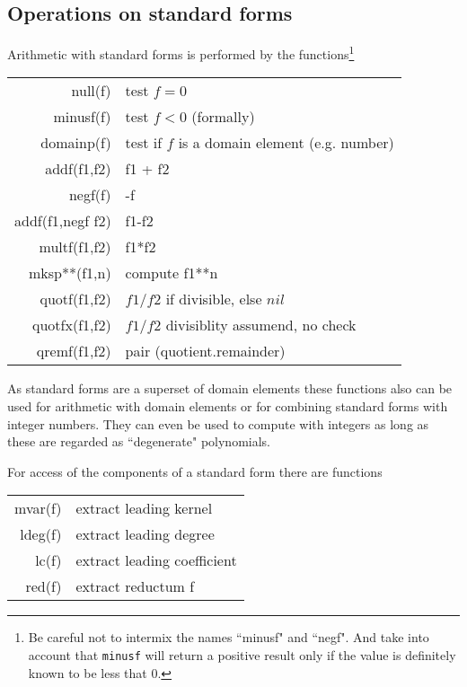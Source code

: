\subsection{Operations on standard forms}

Arithmetic with standard forms is performed by the
functions\footnote{Be careful not to intermix 
the names ``minusf" and ``negf".
And take into account that {\tt minusf} will return a positive result
only if the value is definitely known to be less that 0.}
\begin{center}
\begin{tabular}{|r|l|} \hline
    null(f)    & test $f=0$ \\
    minusf(f)  & test $f<0$ (formally) \\
    domainp(f) & test if $f$ is a domain element (e.g. number) \\
    addf(f1,f2)& f1 + f2 \\
    negf(f)    & -f \\
    addf(f1,negf f2) & f1-f2 \\
    multf(f1,f2) & f1*f2 \\
    mksp**(f1,n) & compute f1**n \\
    quotf(f1,f2) & $f1/f2$ if divisible, else $nil$ \\
    quotfx(f1,f2) & $f1/f2$ divisiblity assumend, no check\\
    qremf(f1,f2) & pair (quotient.remainder) \\
\hline
\end{tabular}
\end{center}
    
As standard forms are a superset of domain elements these
functions also can be used for arithmetic with domain elements
or for combining standard forms with integer numbers. They
can even be used to compute with integers as long as these
are regarded as ``degenerate" polynomials.


For access of the components of a standard form
there are functions

\begin{center}
\begin{tabular}{|r|l|} \hline
    mvar(f)    & extract leading kernel \\
    ldeg(f)    & extract leading degree \\
    lc(f)      & extract leading coefficient \\
    red(f)     & extract reductum f\\  \hline
\end{tabular}
\end{center}


